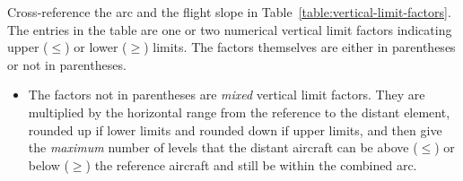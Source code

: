 {%
%
%
%
%

Cross-reference the arc and the flight slope in Table~\ref{table:vertical-limit-factors}. The entries in the table are one or two numerical vertical limit factors indicating upper ($\le$) or lower ($\ge$) limits. The factors themselves are either in parentheses or not in parentheses.

\begin{itemize}

\item
The factors not in parentheses are \emph{mixed} vertical limit factors. They are multiplied by the horizontal range from the reference to the distant element, rounded up if lower limits and rounded down if upper limits, and then give the \emph{maximum} number of levels that the distant aircraft can be above ($\le$) or below ($\ge$) the reference aircraft and still be within the combined arc. 


\end{itemize}}
